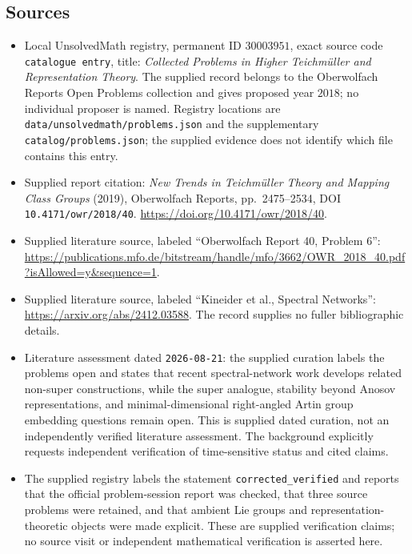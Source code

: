 \documentclass[11pt]{article}
\begin{document}
\subsection{Sources}
\begin{itemize}
\item Local UnsolvedMath registry, permanent ID \(30003951\), exact source code \texttt{catalogue entry}, title: \emph{Collected Problems in Higher Teichmüller and Representation Theory}. The supplied record belongs to the Oberwolfach Reports Open Problems collection and gives proposed year \(2018\); no individual proposer is named. Registry locations are \texttt{data/unsolvedmath/problems.json} and the supplementary \texttt{catalog/problems.json}; the supplied evidence does not identify which file contains this entry.
\item Supplied report citation: \emph{New Trends in Teichmüller Theory and Mapping Class Groups} (2019), Oberwolfach Reports, pp.\ 2475--2534, DOI \texttt{10.4171/owr/2018/40}. \url{https://doi.org/10.4171/owr/2018/40}.
\item Supplied literature source, labeled ``Oberwolfach Report 40, Problem 6'': \url{https://publications.mfo.de/bitstream/handle/mfo/3662/OWR_2018_40.pdf?isAllowed=y&sequence=1}.
\item Supplied literature source, labeled ``Kineider et al., Spectral Networks'': \url{https://arxiv.org/abs/2412.03588}. The record supplies no fuller bibliographic details.
\item Literature assessment dated \texttt{2026-08-21}: the supplied curation labels the problems open and states that recent spectral-network work develops related non-super constructions, while the super analogue, stability beyond Anosov representations, and minimal-dimensional right-angled Artin group embedding questions remain open. This is supplied dated curation, not an independently verified literature assessment. The background explicitly requests independent verification of time-sensitive status and cited claims.
\item The supplied registry labels the statement \texttt{corrected\_verified} and reports that the official problem-session report was checked, that three source problems were retained, and that ambient Lie groups and representation-theoretic objects were made explicit. These are supplied verification claims; no source visit or independent mathematical verification is asserted here.
\end{itemize}
\end{document}
